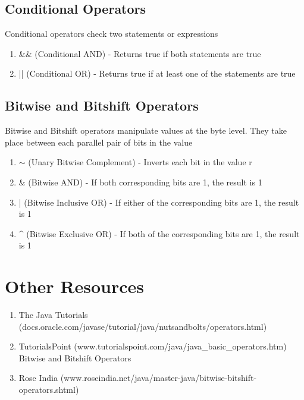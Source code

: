 \documentclass[a4paper]{article}
\begin{document}
\subsection*{Conditional Operators}
Conditional operators check two statements or expressions
\begin{enumerate}

\item \&\& (Conditional AND) - Returns true if both statements are true

\item || (Conditional OR) - Returns true if at least one of the statements are true

\end{enumerate}

\subsection*{Bitwise and Bitshift Operators}
Bitwise and Bitshift operators manipulate values at the byte level. They take place between each parallel pair of bits in the value
\begin{enumerate}

\item $\sim$ (Unary Bitwise Complement) - Inverts each bit in the value
r

\item \& (Bitwise AND) - If both corresponding bits are 1, the result is 1

\item | (Bitwise Inclusive OR) - If either of the corresponding bits are 1, the result is 1

\item \string^ (Bitwise Exclusive OR) - If both of the corresponding bits are 1, the result is 1

\end{enumerate}


\newpage

\section*{Other Resources}
\begin{enumerate}

\item The Java Tutorials (docs.oracle.com/javase/tutorial/java/nutsandbolts/operators.html)

\item TutorialsPoint (www.tutorialspoint.com/java/java\_basic\_operators.htm) \\ 

Bitwise and Bitshift Operators

\item Rose India (www.roseindia.net/java/master-java/bitwise-bitshift-operators.shtml)

\end{enumerate}
\end{document}
